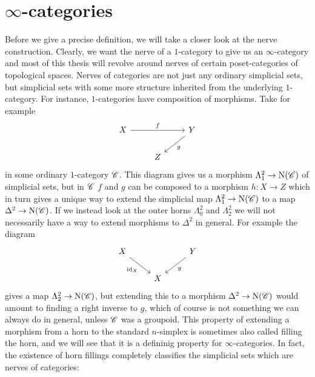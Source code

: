 \documentclass[../../thesis.tex]{subfiles}
\begin{document}
\section{$\infty$-categories}
Before we give a precise definition, we will take a closer look at the nerve construction.
Clearly, we want the nerve of a $1$-category to give us an $\infty$-category and most of this thesis will revolve around nerves of certain poset-categories of topological spaces.
Nerves of categories are not just any ordinary simplicial sets, but simplicial sets with some more structure inherited from the underlying $1$-category.
For instance, $1$-categories have composition of morphisms.
Take for example
\[\begin{tikzcd}
        X && Y \\
        & Z
        \arrow["f", from=1-1, to=1-3]
        \arrow["g", from=1-3, to=2-2]
    \end{tikzcd}\]
in some ordinary $1$-category $\mathscr{C}$.
This diagram gives us a morphism $\Lambda_1^2\to \mathrm{N}(\mathscr{C})$ of simplicial sets, but in $\mathscr{C}$ $f$ and $g$ can be composed to a morphism $h: X \to Z$ which in turn gives a unique way to extend the simplicial map $\Lambda_1^2\to \mathrm{N}(\mathscr{C})$ to a map $\Delta^2 \to \mathrm{N}(\mathscr{C})$.
If we instead look at the outer horns $\Lambda_0^2$ and $\Lambda_2^2$ we will not necessarily have a way to extend morphisms to $\Delta^2$ in general.
For example the diagram
\[\begin{tikzcd}
        X && Y \\
        & X
        \arrow["g", from=1-3, to=2-2]
        \arrow["\id_X"', from=1-1, to=2-2]
    \end{tikzcd}\]
gives a map $\Lambda_2^2\to \mathrm{N}(\mathscr{C})$, but extending this to a morphism $\Delta^2 \to \mathrm{N}(\mathscr{C})$ would amount to finding a right inverse to $g$, which of course is not something we can always do in general, unless $\mathscr{C}$ was a groupoid.
This property of extending a morphism from a horn to the standard $n$-simplex is sometimes also called filling the horn, and we will see that it is a defininig property for $\infty$-categories.
In fact, the existence of horn fillings completely classifies the simplicial sets which are nerves of categories:
\end{document}
